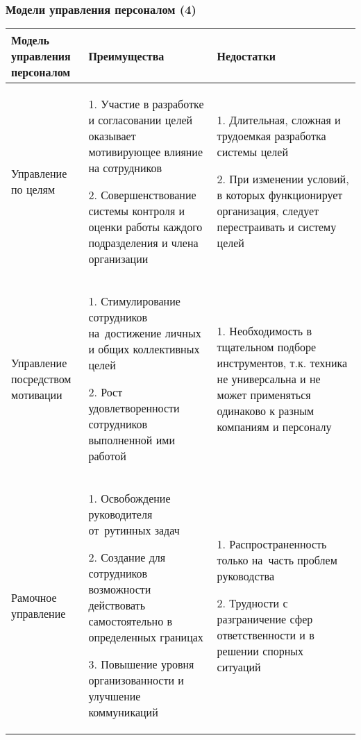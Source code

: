 \documentclass{../industrial-development}
\begin{document}
	\begin{frame} \frametitle{Модели управления персоналом (4)}
		\begin{table}[h]
			\begin{center}
				\begin{tabular}{|p{}|p{3,5cm}|p{}|}
					\hline
					\tiny \textbf{Модель управления персоналом}   & \tiny \textbf{Преимущества} & \tiny \textbf{Недостатки} \\
					\hline
					\tiny Управление по целям & 
					\tiny 1. Участие в разработке и согласовании целей оказывает мотивирующее влияние на сотрудников
					
					2. Совершенствование системы контроля и оценки работы каждого подразделения и члена организации
					& 
					\tiny 1. Длительная, сложная и трудоемкая разработка системы целей 
					
					2. При изменении условий, в которых функционирует организация, следует перестраивать и систему целей \\
					\hline
					\tiny Управление посредством мотивации & 
					\tiny 1. Стимулирование сотрудников на~достижение личных и общих коллективных целей
					
					2. Рост удовлетворенности сотрудников выполненной ими работой
					
					&
					\tiny 1. Необходимость в тщательном подборе инструментов, т.к. техника не универсальна и не может применяться одинаково к разным компаниям и персоналу
					
					\\
					\hline
					\tiny Рамочное управление  & 
					
					\tiny
					1. Освобождение руководителя от~рутинных задач
					
					2. Создание для сотрудников возможности действовать самостоятельно в определенных границах
					
					3. Повышение уровня организованности и улучшение коммуникаций
					&
					\tiny 
					1. Распространенность только на~часть проблем руководства
					
					2. Трудности с разграничение сфер ответственности и в решении спорных ситуаций
					\\
					
					\hline
				\end{tabular}
			\end{center}
		\end{table}
	\end{frame}
	
	\lecturenotes
	
\end{document}
